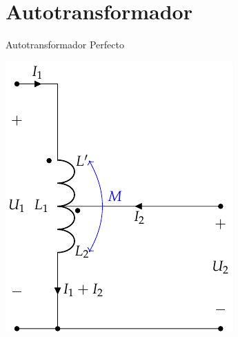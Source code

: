 \documentclass[aspectratio=169, usenames,svgnames,dvipsnames]{beamer}
\begin{document}
\section{Autotransformador}
\label{sec:org353fd12}
\begin{frame}[label={sec:org3023b41}]{Autotransformador Perfecto}
\begin{center}
\includegraphics[height=0.9\textheight]{../figs/AutotrafoPerfecto.pdf}
\end{center}
\end{frame}
\end{document}
